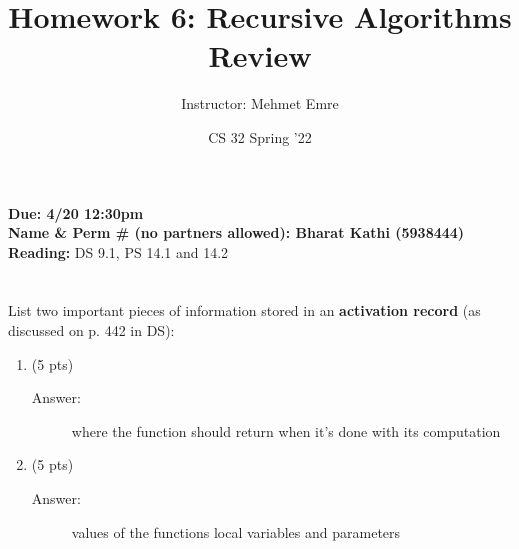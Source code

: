 \documentclass[11pt]{article}
\author{Instructor: Mehmet Emre}
\date{CS 32 Spring '22}
\title{Homework 6: Recursive Algorithms Review}
\begin{document}
\maketitle
\textbf{Due: 4/20 12:30pm} \\ 
\vspace{1em}
\textbf{Name \& Perm \# (no partners allowed): Bharat Kathi (5938444)} \\ 
\vspace{1em}
\textbf{Reading:} DS 9.1, PS 14.1 and 14.2


\section{}
\label{sec:org47c0ffe}
List two important pieces of information stored in an \textbf{activation record} (as
discussed on p. 442 in DS):
\begin{enumerate}
\item (5 pts)

\begin{description}
  \item[Answer:] where the function should return when it's done with its computation
\end{description}

\item (5 pts)

\begin{description}
  \item[Answer:] values of the functions local variables and parameters
\end{description}

\end{enumerate}
\end{document}
